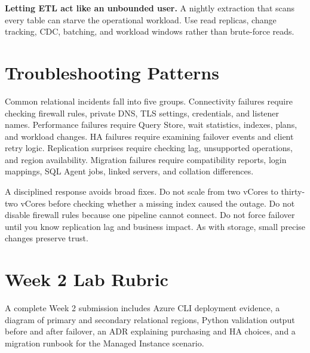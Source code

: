 \begin{pitfall}
\textbf{Letting ETL act like an unbounded user.} A nightly extraction that scans every table can starve the operational workload. Use read replicas, change tracking, CDC, batching, and workload windows rather than brute-force reads.
\end{pitfall}

\section{Troubleshooting Patterns}
Common relational incidents fall into five groups. Connectivity failures require checking firewall rules, private DNS, TLS settings, credentials, and listener names. Performance failures require Query Store, wait statistics, indexes, plans, and workload changes. HA failures require examining failover events and client retry logic. Replication surprises require checking lag, unsupported operations, and region availability. Migration failures require compatibility reports, login mappings, SQL Agent jobs, linked servers, and collation differences.

A disciplined response avoids broad fixes. Do not scale from two vCores to thirty-two vCores before checking whether a missing index caused the outage. Do not disable firewall rules because one pipeline cannot connect. Do not force failover until you know replication lag and business impact. As with storage, small precise changes preserve trust.

\section{Week 2 Lab Rubric}
A complete Week 2 submission includes Azure CLI deployment evidence, a diagram of primary and secondary relational regions, Python validation output before and after failover, an ADR explaining purchasing and HA choices, and a migration runbook for the Managed Instance scenario.


